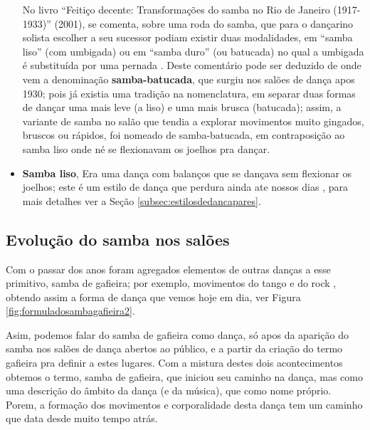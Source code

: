 \begin{itemize}
No livro ``Feitiço decente: Transformações do samba no Rio de Janeiro (1917-1933)'' (2001),
se comenta, sobre uma roda do samba, que para o dançarino solista  escolher a seu sucessor podiam
existir duas modalidades, em ``samba liso'' (com umbigada) ou em ``samba duro'' 
(ou batucada) no qual a umbigada é substituída por uma pernada \cite[pp. 109]{sandroni2001feitico}.
Deste comentário pode ser deduzido de onde vem a denominação \textbf{samba-batucada}, 
que surgiu nos salões de dança apos 1930; pois já existia uma tradição na nomenclatura,
em separar duas formas de dançar uma mais leve (a liso) e uma mais brusca (batucada);
assim, a variante de samba no salão que tendia a explorar movimentos muito  gingados, bruscos ou rápidos,
foi nomeado de samba-batucada, em contraposição ao samba liso onde né se flexionavam os joelhos pra dançar.  


\item \textbf{Samba liso}, 
Era uma dança com balanços que se dançava sem flexionar os joelhos;
este é um estilo de dança que perdura ainda ate nossos 
dias \cite[pp. 58,62]{freitas1959danca} \cite[pp. 143]{perna2002samba}, 
para mais detalhes ver a Seção \ref{subsec:estilosdedancapares}.
\end{itemize}

\subsection{Evolução do samba nos salões}

Com o passar dos anos foram agregados elementos de outras danças a esse primitivo, samba de gafieira;
por exemplo, movimentos do tango e do rock \cite[pp. 142]{perna2002samba}, 
obtendo assim a forma de dança que vemos hoje em dia, ver Figura \ref{fig:formuladosambagafieira2}.

Asim, podemos falar do samba de gafieira como dança, só apos da aparição do samba nos
salões de dança abertos ao público, e a partir da criação do termo gafieira pra definir a estes lugares.
Com a mistura destes dois acontecimentos obtemos o termo, samba de gafieira,
que iniciou seu caminho na dança, mas como uma descrição do âmbito da dança (e da música), que como nome próprio.
Porem, a formação dos movimentos e corporalidade desta dança tem um caminho que data desde muito tempo atrás.


